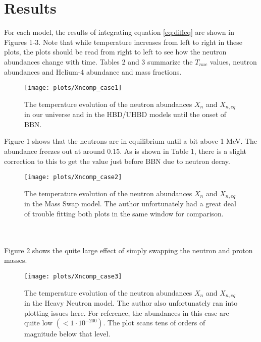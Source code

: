\documentclass[aps,reprint,prl]{revtex4-1}
\begin{document}
\section*{Results}
For each model, the results of integrating equation \ref{eq:diffeq} are shown in Figures 1-3.  Note that while temperature increases from left to right in these plots, the plots should be read from right to left to see how the neutron abundances change with time.  Tables 2 and 3 summarize the $T_{nuc}$ values, neutron abundances and Helium-4 abundance and mass fractions.
\begin{figure}[h]
\texttt{[image: plots/Xncomp\_case1]}
\caption{The temperature evolution of the neutron abundances $X_n$ and $X_{n,eq}$ in our universe and in the HBD/UHBD models until the onset of BBN.}
\end{figure}
Figure 1 shows that the neutrons are in equilibrium until a bit above 1 MeV.  The abundance freezes out at around 0.15.  As is shown in Table 1, there is a slight correction to this to get the value just before BBN due to neutron decay.
\begin{figure}[h]
\texttt{[image: plots/Xncomp\_case2]}
\caption{The temperature evolution of the neutron abundances $X_n$ and $X_{n,eq}$ in the Mass Swap model.  The author unfortunately had a great deal of trouble fitting both plots in the same window for comparison.}
\end{figure}
\\ \\
Figure 2 shows the quite large effect of simply swapping the neutron and proton masses.
\begin{figure}[h]
\texttt{[image: plots/Xncomp\_case3]}
\caption{The temperature evolution of the neutron abundances $X_n$ and $X_{n,eq}$ in the Heavy Neutron model.  The author also unfortunately ran into plotting issues here.  For reference, the abundances in this case are quite low $(<1\cdot10^{-200})$.  The plot scans tens of orders of magnitude below that level.}
\end{figure}
\end{document}
